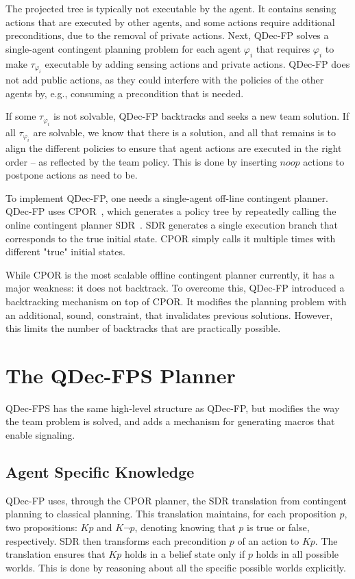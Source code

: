 \documentclass[letterpaper]{article}
\theoremstyle{definition}
\begin{document}
The projected tree is typically not executable by the agent. It contains sensing actions that are executed by other agents, and some actions require additional preconditions, due to the removal of private actions.
Next, QDec-FP solves a single-agent contingent planning problem for each agent $\varphi_i$ that requires $\varphi_i$ to make $\tau_{\varphi_i}$ executable by adding sensing actions and private actions.
QDec-FP does not add public actions, as they could interfere with the policies of the other agents by, e.g., consuming a precondition that is needed.

If some $\tau_{\varphi_i}$ is not solvable, QDec-FP backtracks and seeks a new team solution.
If all $\tau_{\varphi_i}$ are solvable, we know that there is a solution, and all that remains is to align the different policies to ensure that agent actions are executed in the right order -- as reflected by the team policy. This is done by inserting $noop$ actions to postpone actions as need to be.

To implement QDec-FP,
one needs a single-agent off-line contingent planner.
QDec-FP uses CPOR~\citep{CPOR}, which generates a policy tree by repeatedly calling the online contingent planner SDR~\citep{SDR}. SDR generates a single execution branch that corresponds to the true initial state. CPOR
simply calls it multiple times with different "true" initial states.

While CPOR is the most scalable offline contingent planner currently, it has a major weakness: it does not backtrack.
To overcome this, QDec-FP introduced a backtracking mechanism on top of CPOR. It modifies the planning problem with an additional, sound, constraint, that invalidates
previous solutions.
However, this limits the number of backtracks that are practically possible.



\section{The QDec-FPS Planner}
QDec-FPS
has the
same high-level structure as QDec-FP, but modifies the way the team problem is solved, and adds a %
mechanism for generating macros that enable signaling.


\subsection{Agent Specific Knowledge}


QDec-FP uses, through the CPOR planner, the SDR translation from contingent planning to classical planning. This translation maintains, for each proposition $p$, two propositions: $Kp$ and $K\neg p$, denoting knowing that $p$ is true or false, respectively.
SDR then transforms each precondition $p$ of an action to $Kp$.
The translation ensures that $Kp$ holds in a belief state only if $p$ holds in all possible worlds.
This is done by reasoning about all the specific possible worlds explicitly.
\end{document}
